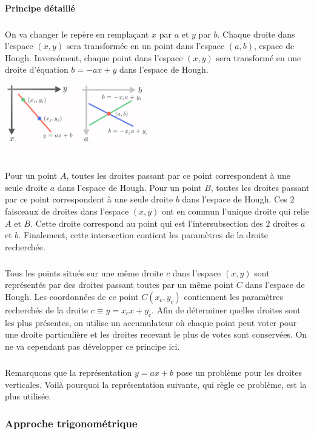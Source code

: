 \paragraph{Principe d\'etaill\'e}
\subparagraph{}
On va changer le rep\`ere en rempla\c cant $x$ par $a$ et $y$ par $b$.
Chaque droite dans l'espace $(x, y)$ sera transform\'ee en un point dans l'espace $(a, b)$, espace de Hough.
Invers\'ement, chaque point dans l'espace $(x, y)$ sera transform\'e en une droite d'\'equation $b=-ax+y$ dans l'espace de Hough.
\begin{center}
\includegraphics[height=3cm]{images/hough_3.png}
\end{center}
\subparagraph{}
Pour un point $A$, toutes les droites passant par ce point correspondent \`a une seule droite $a$ dans l'espace de Hough.
Pour un point $B$, toutes les droites passant par ce point correspondent \`a une seule droite $b$ dans l'espace de Hough.
Ces $2$ faisceaux de droites dans l'espace $(x, y)$ ont en commun l'unique droite qui relie $A$ et $B$.
Cette droite correspond au point qui est l'intersubsection des $2$ droites $a$ et $b$.
Finalement, cette intersection contient les param\`etres de la droite recherch\'ee.

\subparagraph{}
Tous les points situ\'es sur une m\^eme droite $c$ dans l'espace $(x, y)$ sont repr\'esent\'es par des droites passant toutes par un m\^eme point $C$ dans l'espace de Hough.
Les coordonn\'ees de ce point $C(x_c, y_c)$ contiennent les param\`etres recherch\'es de la droite $c \equiv y=x_cx+y_c$. Afin de déterminer quelles droites sont les plus présentes, on utilise un accumulateur o\`u chaque point peut voter pour une droite particuli\`ere et les droites recevant le plus de votes sont conserv\'ees.
On ne va cependant pas d\'evelopper ce principe ici.

\subparagraph{}
Remarquons que la repr\'esentation $y=ax+b$ pose un probl\`eme pour les droites verticales.  Voil\`a pourquoi la repr\'esentation suivante, qui r\`egle ce probl\`eme, est la plus utilis\'ee.

\subsubsection{Approche trigonom\'etrique}

